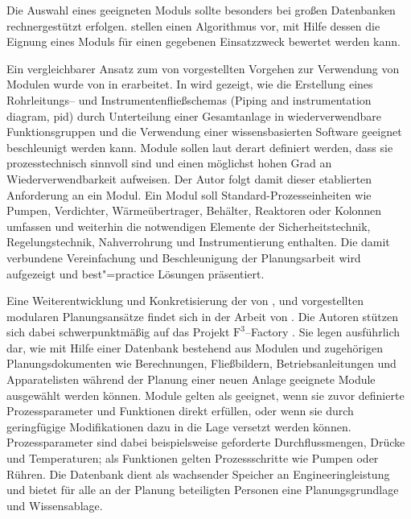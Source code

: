 Die Auswahl eines geeigneten Moduls sollte besonders bei gro\ss{}en Datenbanken rechnergest\"utzt erfolgen. \citeauthor{Obst_2013} stellen einen Algorithmus vor, mit Hilfe dessen die Eignung eines Moduls f\"ur einen gegebenen Einsatzzweck bewertet werden kann. \cite{Obst_2013}

Ein vergleichbarer Ansatz zum von \citeauthor{Hady_2012} vorgestellten Vorgehen zur Verwendung von Modulen wurde von \citeauthor{Uzuner_2013} in \cite{Uzuner_2012, Uzuner_2013} erarbeitet. In  wird gezeigt, wie die Erstellung eines Rohrleitungs-- und Instrumentenflie\ss{}schemas (Piping and instrumentation diagram, \ac{pid}) durch Unterteilung einer Gesamtanlage in wiederverwendbare Funktionsgruppen und die Verwendung einer wissensbasierten Software geeignet beschleunigt werden kann. Module sollen laut \citeauthor{Uzuner_2013} derart definiert werden, dass sie prozesstechnisch sinnvoll sind und einen m\"oglichst hohen Grad an Wiederverwendbarkeit aufweisen. Der Autor folgt damit dieser etablierten Anforderung an ein Modul. Ein Modul soll Standard-Prozesseinheiten wie Pumpen, Verdichter, W\"arme\"ubertrager, Beh\"alter, Reaktoren oder Kolonnen umfassen und weiterhin die notwendigen Elemente der Sicherheitstechnik, Regelungstechnik, Nahverrohrung und Instrumentierung enthalten. Die damit verbundene Vereinfachung und Beschleunigung der Planungsarbeit wird aufgezeigt und best"=practice L\"osungen pr\"asentiert.

Eine Weiterentwicklung und Konkretisierung der von \citeauthor{Bramsiepe_2012}, \citeauthor{Uzuner_2012} und \citeauthor{Hady_2012} \cite{Bramsiepe_2012, Uzuner_2012, Hady_2012} vorgestellten modularen Planungsans\"atze findet sich in der Arbeit  von \citeauthor{Fleischer_2016} \cite{Fleischer_2016}. Die Autoren st\"utzen sich dabei schwerpunktm\"a\ss{}ig auf das Projekt $\text{F}^{3}$--Factory \cite{f3_2014}. Sie legen ausf\"uhrlich dar, wie mit Hilfe einer Datenbank bestehend aus Modulen und zugeh\"origen Planungsdokumenten wie Berechnungen, Flie\ss{}bildern, Betriebsanleitungen und Apparatelisten w\"ahrend der Planung einer neuen Anlage geeignete Module ausgew\"ahlt werden k\"onnen. Module gelten als geeignet, wenn sie zuvor definierte Prozessparameter und Funktionen direkt erf\"ullen, oder wenn sie durch geringf\"ugige Modifikationen dazu in die Lage versetzt werden k\"onnen. Prozessparameter sind dabei beispielsweise geforderte Durchflussmengen, Dr\"ucke und Temperaturen; als Funktionen gelten Prozessschritte wie Pumpen oder R\"uhren. Die Datenbank dient als wachsender Speicher an Engineeringleistung und bietet f\"ur alle an der Planung beteiligten Personen eine Planungsgrundlage und Wissensablage. 

